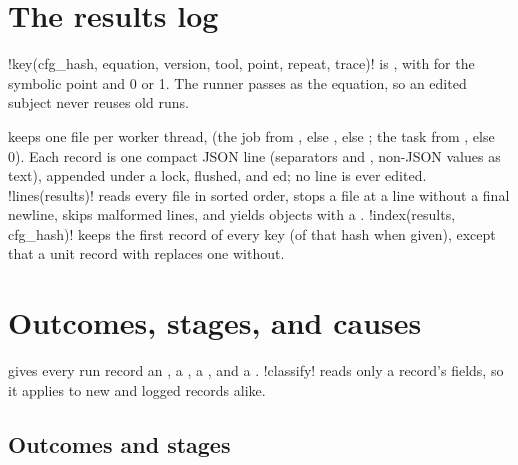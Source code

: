 \section{The results log}\label{sec:bench-log}

\begin{definition}\label{def:bench-key}
\py!key(cfg_hash, equation, version, tool, point, repeat, trace)! is
, with  for the symbolic
point and  0 or 1. The runner passes  as the equation, so an edited
subject never reuses old runs.
\end{definition}

 keeps one file per worker thread,
 (the job from , else
, else ; the task from , else 0). Each
record is one compact JSON line (separators \code{,} and \code{:}, non-JSON values as text),
appended under a lock, flushed, and ed; no line is ever edited.
\py!lines(results)! reads every file in sorted order, stops a file at a line without a final
newline, skips malformed lines, and yields objects with a . \py!index(results, cfg_hash)! keeps the first record of every key (of that hash when given), except that a unit
record with  replaces one without.

\section{Outcomes, stages, and causes}\label{sec:bench-outcomes}

 gives every run record an , a , a
, and a . \py!classify! reads only a record's fields, so it
applies to new and logged records alike.

\subsection{Outcomes and stages}

